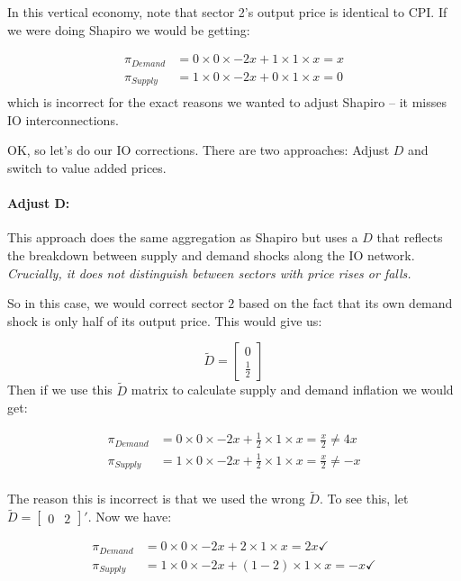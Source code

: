 \documentclass[12pt,english]{article}
\begin{document}
In this vertical economy, note that sector 2's output price is identical to CPI. If we were doing Shapiro we would be getting:

\begin{align*}
	\pi_{Demand} &= 0 \times 0 \times -2x + 1 \times 1 \times x = x\\
	\pi_{Supply} &= 1 \times 0 \times -2x + 0 \times 1 \times x = 0\\	
\end{align*}
which is incorrect for the exact reasons we wanted to adjust Shapiro -- it misses IO interconnections.

OK, so let's do our IO corrections. There are two approaches: Adjust $D$ and switch to value added prices.

\paragraph{Adjust D:} This approach does the same aggregation as Shapiro but uses a $D$ that reflects the breakdown between supply and demand shocks along the IO network. \emph{Crucially, it does not distinguish between sectors with price rises or falls.}

So in this case, we would correct sector $2$ based on the fact that its own demand shock is only half of its output price. This would give us:

\[
	\tilde{D} = \begin{bmatrix}
		0\\
		\frac{1}{2}
	\end{bmatrix}
\]
Then if we use this $\tilde{D}$ matrix to calculate supply and demand inflation we would get:

\begin{align*}
	\pi_{Demand} &= 0 \times 0 \times -2x + \frac{1}{2} \times 1 \times x = \frac{x}{2}\neq 4x\\
	\pi_{Supply} &= 1 \times 0 \times -2x + \frac{1}{2} \times 1 \times x = \frac{x}{2}\neq -x\\	
\end{align*}

The reason this is incorrect is that we used the wrong $\tilde{D}$. To see this, let $\tilde{D} = \begin{bmatrix}
		0&
		2
	\end{bmatrix}'$. Now we have:

\begin{align*}
	\pi_{Demand} &= 0 \times 0 \times -2x + 2 \times 1 \times x = 2x\checkmark\\
	\pi_{Supply} &= 1 \times 0 \times -2x + (1-2) \times 1 \times x = -x \checkmark\\	
\end{align*}
\end{document}

